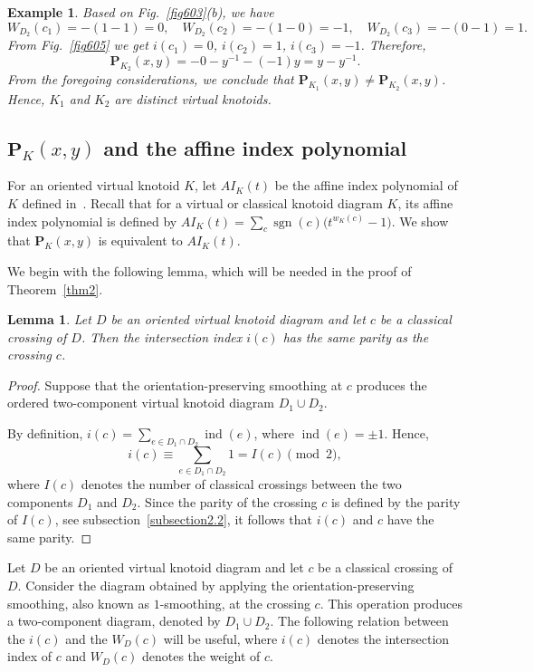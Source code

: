 \documentclass[10pt,a4paper]{amsart}
\newtheorem{lemma}{Lemma}[section]
\newtheorem{example}{Example}[section]
\numberwithin{equation}{section}
\numberwithin{equation}{section}
\begin{document}
\begin{example}
{		Based on Fig.~\ref{fig603}(b), we have 
		$$
		W_{D_2}(c_1)=-(1-1)=0, \quad W_{D_2}(c_2)=-(1-0)=-1, \quad
		W_{D_2}(c_3)=-(0-1)=1.
		$$ 
		From Fig.~\ref{fig605} we get $i(c_1)=0$, $i(c_2)=1$, $i(c_3)=-1$. Therefore, 
		$$
		\mathbf{P}_{K_2}(x,y)=-0-y^{-1}-(-1)y=y-y^{-1}.
		$$ 
		From the foregoing considerations, we conclude that $\mathbf{P}_{K_1}(x,y)\neq \mathbf{P}_{K_2}(x,y)$. Hence, $K_1$ and $K_2$ are distinct virtual knotoids.    
	}
\end{example}

\subsection{$\mathbf{P}_K(x,y)$ and the affine index polynomial} \label{subsection3.1}

For an oriented virtual knotoid $K$, let $AI_K(t)$ be the affine index polynomial of $K$ defined in~\cite{GK}. Recall that for a virtual or classical knotoid diagram $K$, its affine index polynomial is defined by $AI_K(t)=\sum_{c}\operatorname{sgn}(c)\bigl(t^{w_K(c)}-1\bigr)$. We show that $\mathbf{P}_K(x,y)$ is equivalent to $AI_K(t)$.


We begin with the following lemma, which will be needed in the proof of Theorem~\ref{thm2}.	

\begin{lemma}\label{lm2}
	Let $D$ be an oriented virtual knotoid diagram and let $c$ be a classical crossing of $D$. Then the intersection index $i(c)$ has the same parity as the crossing $c$.
\end{lemma}

\begin{proof}
	Suppose that the orientation-preserving smoothing at $c$ produces the ordered two-component virtual knotoid diagram $D_1\cup D_2$.
	
	By definition,
	$ i(c)=\sum_{e\in D_1\cap D_2}\operatorname{ind}(e)$,	
	where $\operatorname{ind}(e)=\pm1$. Hence,
	$$
	i(c)\equiv
	\sum_{e\in D_1\cap D_2}1=I(c)\pmod2,
	$$
	where $I(c)$ denotes the number of classical crossings between the two components $D_1$ and $D_2$. Since the parity of the crossing $c$ is defined by the parity of $I(c)$, see subsection~\ref{subsection2.2}, it follows that $i(c)$ and $c$ have the same parity.
\end{proof}

Let $D$ be an oriented virtual knotoid diagram and let $c$ be a classical crossing of $D$. Consider the diagram obtained by applying the orientation-preserving smoothing, also known as  $1$-smoothing, at the crossing $c$. This operation produces a two-component diagram, denoted by $D_1 \cup D_2$. The following relation between the $i(c)$ and the $W_D(c)$ will be useful, where $i(c)$ denotes the intersection index of $c$ and $W_D(c)$ denotes the weight of $c$.
\end{document}
